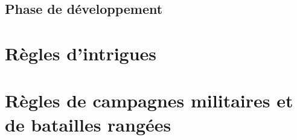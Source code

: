\documentclass[10pt,a4paper]{book}
\begin{document}
\begin{multicols}{2}
\subsection{Phase de développement}



\section{Règles d'intrigues}
\section{Règles de campagnes militaires et de batailles rangées}

\end{multicols}
\end{document}
